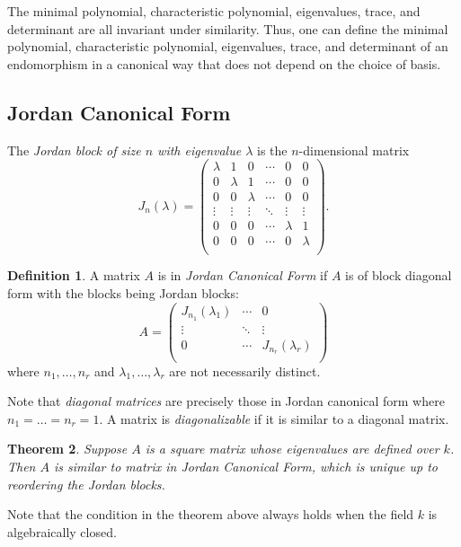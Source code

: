 \documentclass[12pt]{article}
\theoremstyle{plain}
\newtheorem{theorem}{Theorem}[section]
\theoremstyle{definition}
\newtheorem{definition}[theorem]{Definition}
\theoremstyle{remark}
\numberwithin{equation}{section}
\begin{document}
The minimal polynomial, characteristic polynomial, eigenvalues,
trace, and determinant are all invariant under similarity.
Thus, one can define the minimal polynomial,
characteristic polynomial, eigenvalues, trace, and determinant of an
endomorphism in a canonical way that does not depend on the choice of
basis.

\subsection{Jordan Canonical Form}

The \emph{Jordan block of size $n$ with eigenvalue $\lambda$} is the
$n$-dimensional matrix
\[
J_n(\lambda) = \begin{pmatrix}
\lambda & 1 & 0 & \cdots & 0 & 0\\
0 & \lambda & 1 & \cdots & 0 & 0\\
0 & 0& \lambda & \cdots & 0 & 0\\
\vdots & \vdots & \vdots & \ddots & \vdots & \vdots \\
0 & 0 & 0 & \cdots & \lambda & 1\\
0 & 0 & 0 & \cdots & 0 & \lambda\\
 \end{pmatrix} .
\]

\begin{definition}
A matrix $A$ is in \emph{Jordan Canonical Form} if $A$ is of block
diagonal form with the blocks being Jordan blocks:
\[
A = \begin{pmatrix}
J_{n_1}(\lambda_1) & \cdots & 0\\
\vdots & \ddots & \vdots\\
0 & \cdots & J_{n_r}(\lambda_r)\\
\end{pmatrix} 
\]
where $n_1,\ldots,n_r$ and $\lambda_1,\ldots,\lambda_r$
are not necessarily distinct.
\end{definition}

Note that \emph{diagonal matrices} are precisely those in Jordan
canonical form where $n_1=\ldots=n_r=1$.
A matrix is \emph{diagonalizable} if it is similar to a diagonal matrix.

\begin{theorem}
Suppose $A$ is a square matrix whose eigenvalues are defined over $k$.
Then $A$ is similar to matrix in Jordan Canonical Form,
which is unique up to reordering the Jordan blocks.
\end{theorem}

Note that the condition in the theorem above always holds when the
field $k$ is algebraically closed.
\end{document}
